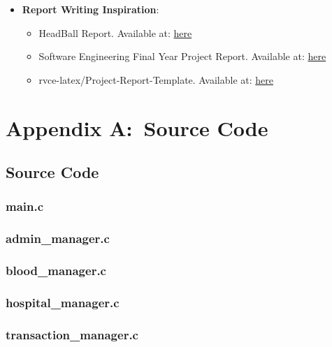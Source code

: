 \documentclass[12pt,a4paper]{report}
\begin{document}
\begin{itemize}
    \item \textbf{Report Writing Inspiration}:
    \begin{itemize}
        \item HeadBall Report. Available at: \href{https://raw.githubusercontent.com/RujalAcharya/HeadBall/main/project_report.pdf}{here}
        \item Software Engineering Final Year Project Report. Available at: \href{https://www.slideshare.net/judebwayo/software-engineering-final-year-project-report}{here}
        \item rvce-latex/Project-Report-Template. Available at: \href{https://github.com/rvce-latex/Project-Report-Template/blob/main/Main.pdf}{here}
    \end{itemize}
\end{itemize}

\appendix
\chapter{Appendix A:\ Source Code}

\section{Source Code}
\subsection{main.c}


\subsection{admin\_manager.c}


\subsection{blood\_manager.c}


\subsection{hospital\_manager.c}


\subsection{transaction\_manager.c}

\end{document}
